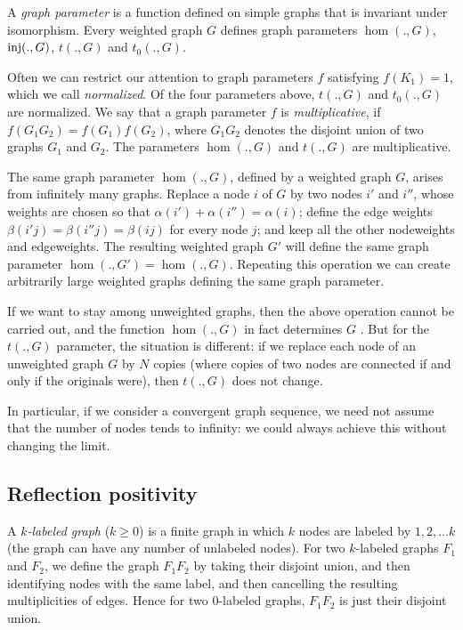 \documentclass[fleqn]{article}
\begin{document}
\medskip

A {\it graph parameter} is a function defined on simple graphs that
is invariant under isomorphism. Every weighted graph $G$ defines
graph parameters $\hom(.,G)$, ${\rm inj}(.,G)$, $t(.,G)$ and $t_0(.,G)$.

Often we can restrict our attention to graph parameters $f$
satisfying $f(K_1)=1$, which we call {\it normalized}. Of the four
parameters above, $t(.,G)$ and $t_0(.,G)$ are normalized. We say that
a graph parameter $f$ is {\it multiplicative}, if
$f(G_1G_2)=f(G_1)f(G_2)$, where $G_1G_2$ denotes the disjoint union
of two graphs $G_1$ and $G_2$. The parameters $\hom(.,G)$ and
$t(.,G)$ are multiplicative.

The same graph parameter $\hom(.,G)$, defined by a weighted graph
$G$, arises from infinitely many graphs. Replace a node $i$ of $G$ by
two nodes $i'$ and $i''$, whose weights are chosen so that
$\alpha(i')+\alpha(i'')=\alpha(i)$; define the edge weights
$\beta(i'j)=\beta(i''j)=\beta(ij)$ for every node $j$; and keep all
the other nodeweights and edgeweights. The resulting weighted graph
$G'$ will define the same graph parameter $\hom(.,G')=\hom(.,G)$.
Repeating this operation we can create arbitrarily large weighted
graphs defining the same graph parameter.

If we want to stay among unweighted graphs, then the above operation
cannot be carried out, and the function $\hom(.,G)$ in fact
determines $G$ \cite{LL}. But for the $t(.,G)$ parameter, the
situation is different: if we replace each node of an unweighted
graph $G$ by $N$ copies (where copies of two nodes are connected if
and only if the originals were), then $t(.,G)$ does not change.

In particular, if we consider a convergent graph sequence, we need
not assume that the number of nodes tends to infinity: we could
always achieve this without changing the limit.

\subsection{Reflection positivity}\label{REFPOS}

A {\it $k$-labeled graph} ($k\ge 0$) is a finite graph in which $k$
nodes are labeled by $1,2,\dots k$ (the graph can have any number of
unlabeled nodes). For two $k$-labeled graphs $F_1$ and $F_2$, we
define the graph $F_1F_2$ by taking their disjoint union, and then
identifying nodes with the same label, and then cancelling the
resulting multiplicities of edges. Hence for two $0$-labeled graphs,
$F_1F_2$ is just their disjoint union.
\end{document}
